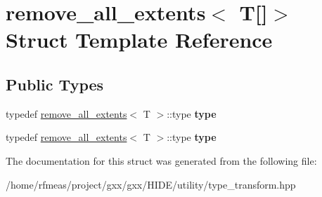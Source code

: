 \hypertarget{structremove__all__extents_3_01T[]_4}{}\section{remove\+\_\+all\+\_\+extents$<$ T\mbox{[}\mbox{]}$>$ Struct Template Reference}
\label{structremove__all__extents_3_01T[]_4}
\subsection*{Public Types}
\begin{DoxyCompactItemize}
\item 
typedef \hyperlink{structremove__all__extents}{remove\+\_\+all\+\_\+extents}$<$ T $>$\+::type {\bfseries type}\hypertarget{structremove__all__extents_3_01T[]_4_a369196cb5d71cc2f67d4d7aad203d7ad}{}\label{structremove__all__extents_3_01T[]_4_a369196cb5d71cc2f67d4d7aad203d7ad}

\item 
typedef \hyperlink{structremove__all__extents}{remove\+\_\+all\+\_\+extents}$<$ T $>$\+::type {\bfseries type}\hypertarget{structremove__all__extents_3_01T[]_4_a369196cb5d71cc2f67d4d7aad203d7ad}{}\label{structremove__all__extents_3_01T[]_4_a369196cb5d71cc2f67d4d7aad203d7ad}

\end{DoxyCompactItemize}


The documentation for this struct was generated from the following file\+:\begin{DoxyCompactItemize}
\item 
/home/rfmeas/project/gxx/gxx/\+H\+I\+D\+E/utility/type\+\_\+transform.\+hpp\end{DoxyCompactItemize}

